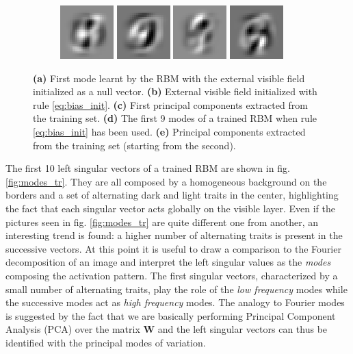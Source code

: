 \documentclass{revtex4-1}
\begin{document}
\begin{figure}
\begin{subfigure}{\linewidth}
    \includegraphics[width=.1\linewidth]{X_l_eigv_7.eps}
    \includegraphics[width=.1\linewidth]{X_l_eigv_8.eps}
    \includegraphics[width=.1\linewidth]{X_l_eigv_9.eps}
    \includegraphics[width=.1\linewidth]{X_l_eigv_10.eps}
    \caption{}
    \label{fig:modes_data}
  \end{subfigure}
 \caption{\textbf{(a)} First mode learnt by the RBM with the external visible field initialized as a null vector. \textbf{(b)} External visible field initialized with rule \eqref{eq:bias_init}. \textbf{(c)} First principal components extracted from the training set. \textbf{(d)} The first 9 modes of a trained RBM when rule \eqref{eq:bias_init}  has been used. \textbf{(e)} Principal components extracted from the training set (starting from the second).}
\end{figure}

The first 10 left singular vectors of a trained RBM are shown in fig. \ref{fig:modes_tr}. They are all composed by a homogeneous background on the borders and a set of alternating dark and light traits in the center, highlighting the fact that each singular vector acts globally on the visible layer. Even if the pictures seen in fig. \ref{fig:modes_tr} are quite different one from another, an interesting trend is found: a higher number of alternating traits is present in the successive vectors. At this point it is useful to draw a comparison to the Fourier decomposition of an image and interpret the left singular values as the \textit{modes} composing the activation pattern. The first singular vectors, characterized by a small number of alternating traits, play the role of the \textit{low frequency} modes while the successive modes act as \textit{high frequency} modes. The analogy to Fourier modes is suggested by the fact that we are basically performing Principal Component Analysis (PCA) over the matrix \textbf{W} and the left singular vectors can thus be identified with the principal modes of variation.
\end{document}
